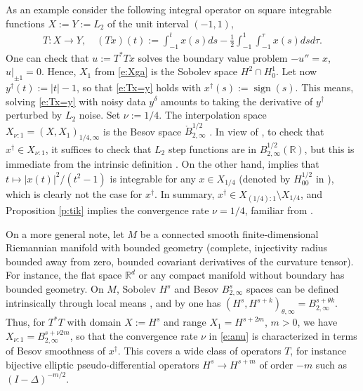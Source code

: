 \documentclass[10pt, a4paper]{iopart}
\newcommand{\IR}{\mathbb{R}}
\newcommand{\norm}[2]{     \| #1       \|_{ #2 }}
\theoremstyle{remark}
\theoremstyle{definition}
\providecommand{\REV}[1]{{#1}}
\begin{document}
	As an example
	consider
	the following integral operator
	on
	square integrable functions
	$X := Y := L_2$
	of the unit interval $(-1, 1)$,
	\begin{align}
		\textstyle
		T : X \to Y,
		\quad
		(T x)(t)
		:=
		\int_{-1}^{t} x(s) ds
		-
		\frac{1}{2}
		\int_{-1}^1 
			\int_{-1}^\tau x(s) ds
		d\tau
		.
	\end{align}
	One can check that
	$u := T^* T x$
	solves
	the boundary value problem
	$-u'' = x$, $u|_{\pm1} = 0$.
	Hence, 
	$X_1$ from \eqref{e:Xga}
	is 
	the Sobolev space $H^2 \cap H_0^1$.
	Let now $y^\dagger(t) := |t| - 1$,
	so that \eqref{e:Tx=y}
	holds
	with $x^\dagger(s) := \mathop{\mathrm{sign}}(s)$.
	This means, 
	solving \eqref{e:Tx=y} with noisy data $y^\delta$
	amounts to taking the derivative of $y^\dagger$
	perturbed by $L_2$ noise.
	Set $\nu := 1/4$.
	The interpolation space
	$X_{\nu:1} = (X, X_1)_{1/4, \infty}$
	is the Besov space $\mathring{B}_{2, \infty}^{1/2}$
	\cite[Prop 1.25 and 1.30]{Guidetti1991}.
	In view of \cite[Def 1.12 of $\mathring{B}$]{Guidetti1991},
	to check that $x^\dagger \in X_{\nu:1}$,
	it suffices to check that
	$L_2$ step functions are in 
	$B_{2,\infty}^{1/2}(\IR)$,
	but
	this is immediate from
	the intrinsic definition 
	\cite[Def 1.1]{Guidetti1991}.
	On the other hand,
	\cite[Ch 1, Thm 11.7]{LionsMagenes1972}
	implies that
	$t \mapsto |x(t)|^2 / (t^2 - 1)$ is integrable
	for any $x \in X_{1/4}$
	(denoted by $H_{00}^{1/2}$ in \cite{LionsMagenes1972}),
	which is clearly not the case for $x^\dagger$.
	In summary,
	$x^\dagger \in X_{(1/4):1} \setminus X_{1/4}$,
	and 
	Proposition \ref{p:tik}
	implies 
	the  
	convergence rate $\nu = 1/4$,
	familiar from \cite[Example 5]{FlemmingHofmannMathe2011}.

\REV{%
	On a more general note,
	let $M$ be
	a connected smooth finite-dimensional Riemannian manifold
	with bounded geometry
	(complete, injectivity radius bounded away from zero, bounded covariant derivatives of the curvature tensor). 
	For instance, 
	the flat space $\IR^d$
	or
	any compact manifold without boundary
	has bounded geometry.
	On $M$,
	Sobolev $H^s$ and Besov $B_{2,\infty}^s$
	spaces can be defined 
	intrinsically through local means \cite[\S1.11.4]{Triebel1992},
	and by \cite[\S1.11.3]{Triebel1992}
	one has
	$(H^s, H^{s+k})_{\theta, \infty} = B_{2,\infty}^{s + \theta k}$.
	Thus, 
	for $T^* T$ with domain $X := H^s$ and range $X_1 = H^{s + 2m}$,
	$m > 0$,
	we have
	$X_{\nu:1} = B_{2,\infty}^{s + \nu 2 m}$,
	so that the convergence rate $\nu$ in \eqref{e:anu}
	is characterized in terms of Besov smoothness of $x^\dagger$.
	This covers a wide class of operators $T$,
	for instance 
	bijective elliptic pseudo-differential operators
	$H^s \to H^{s+m}$
	of order $-m$
	such as
	$(I - \Delta)^{-m/2}$.
}%
	
\end{document}
